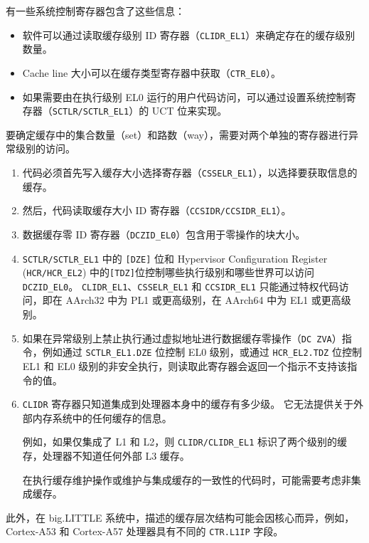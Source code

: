 有一些系统控制寄存器包含了这些信息：

\begin{itemize}
  \item 软件可以通过读取缓存级别 ID 寄存器（\lstinline!CLIDR_EL1!）来确定存在的缓存级别数量。
  \item Cache line 大小可以在缓存类型寄存器中获取（\lstinline!CTR_EL0!）。
  \item 如果需要由在执行级别 EL0 运行的用户代码访问，可以通过设置系统控制寄存器（\lstinline!SCTLR/SCTLR_EL1!）的 UCT 位来实现。
\end{itemize}

要确定缓存中的集合数量（set）和路数（way），需要对两个单独的寄存器进行异常级别的访问。

\begin{enumerate}
  \item 代码必须首先写入缓存大小选择寄存器（\lstinline!CSSELR_EL1!），以选择要获取信息的缓存。
  \item 然后，代码读取缓存大小 ID 寄存器（\lstinline!CCSIDR/CCSIDR_EL1!）。
  \item 数据缓存零 ID 寄存器（\lstinline!DCZID_EL0!）包含用于零操作的块大小。
  \item \lstinline!SCTLR/SCTLR_EL1! 中的 \lstinline![DZE]! 位和 Hypervisor Configuration Register (\lstinline!HCR/HCR_EL2!) 中的\lstinline![TDZ]!位控制哪些执行级别和哪些世界可以访问 \lstinline!DCZID_EL0!。
    \lstinline!CLIDR_EL1!、\lstinline!CSSELR_EL1! 和 \lstinline!CCSIDR_EL1! 只能通过特权代码访问，即在 AArch32 中为 PL1 或更高级别，在 AArch64 中为 EL1 或更高级别。
  \item 如果在异常级别上禁止执行通过虚拟地址进行数据缓存零操作（\lstinline!DC ZVA!）指令，例如通过 \lstinline!SCTLR_EL1.DZE! 位控制 EL0 级别，或通过 \lstinline!HCR_EL2.TDZ! 位控制 EL1 和 EL0 级别的非安全执行，则读取此寄存器会返回一个指示不支持该指令的值。

  \item \lstinline!CLIDR! 寄存器只知道集成到处理器本身中的缓存有多少级。
  它无法提供关于外部内存系统中的任何缓存的信息。

    例如，如果仅集成了 L1 和 L2，则 \lstinline!CLIDR/CLIDR_EL1! 标识了两个级别的缓存，处理器不知道任何外部 L3 缓存。

    在执行缓存维护操作或维护与集成缓存的一致性的代码时，可能需要考虑非集成缓存。
\end{enumerate}


此外，在 big.LITTLE 系统中，描述的缓存层次结构可能会因核心而异，例如，Cortex-A53 和 Cortex-A57 处理器具有不同的 \lstinline!CTR.L1IP! 字段。

